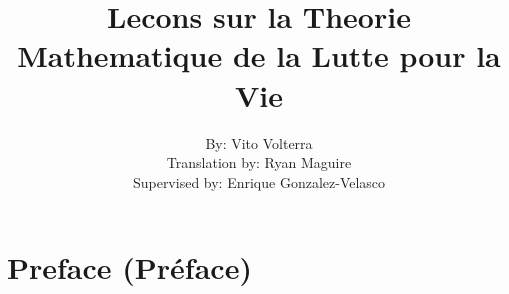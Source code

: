 \documentclass[crop=false,class=book,oneside]{standalone}
\begin{document}
    \ifx\ifmain\undefined
        \title{Lecons sur la Theorie Mathematique
               de la Lutte pour la Vie}
        \author{By: Vito Volterra\\
                Translation by: Ryan Maguire\\
                Supervised by: Enrique Gonzalez-Velasco}
        \date{\vspace{-5ex}}
        \maketitle
        \tableofcontents
        \listoffigures
        \listoftables
        \clearpage
    \fi
    \chapter*{Preface (Pr\'{e}face)}
\end{document}
